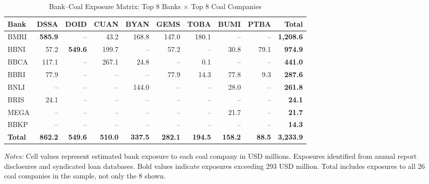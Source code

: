 \begin{table}[htbp]
\centering
\caption{Bank--Coal Exposure Matrix: Top 8 Banks $\times$ Top 8 Coal Companies}
\label{tab:exposure_matrix}
\footnotesize
\setlength{\tabcolsep}{4pt}
\begin{tabular}{lrrrrrrrrr}
\toprule
Bank & DSSA & DOID & CUAN & BYAN & GEMS & TOBA & BUMI & PTBA & Total \\
\midrule
  BMRI & \textbf{585.9} & -- & 43.2 & 168.8 & 147.0 & 180.1 & -- & -- & \textbf{1,208.6} \\
  BBNI & 57.2 & \textbf{549.6} & 199.7 & -- & 57.2 & -- & 30.8 & 79.1 & \textbf{974.9} \\
  BBCA & 117.1 & -- & 267.1 & 24.8 & -- & 0.1 & -- & -- & \textbf{441.0} \\
  BBRI & 77.9 & -- & -- & -- & 77.9 & 14.3 & 77.8 & 9.3 & \textbf{287.6} \\
  BNLI & -- & -- & -- & 144.0 & -- & -- & 28.0 & -- & \textbf{261.8} \\
  BRIS & 24.1 & -- & -- & -- & -- & -- & -- & -- & \textbf{24.1} \\
  MEGA & -- & -- & -- & -- & -- & -- & 21.7 & -- & \textbf{21.7} \\
  BBKP & -- & -- & -- & -- & -- & -- & -- & -- & \textbf{14.3} \\
\midrule
  \textbf{Total} & \textbf{862.2} & \textbf{549.6} & \textbf{510.0} & \textbf{337.5} & \textbf{282.1} & \textbf{194.5} & \textbf{158.2} & \textbf{88.5} & \textbf{3,233.9} \\
\bottomrule
\end{tabular}

\smallskip
\noindent \textit{Notes:} Cell values represent estimated bank exposure to each coal company in USD millions. Exposures identified from annual report disclosures and syndicated loan databases. Bold values indicate exposures exceeding 293 USD million. Total includes exposures to all 26 coal companies in the sample, not only the 8 shown.
\end{table}
